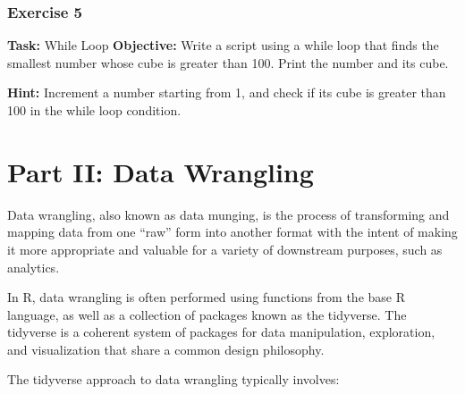 \documentclass[
]{book}
\begin{document}
\subsection*{Exercise 5}\label{exercise-5-1}

\textbf{Task:} While Loop
\textbf{Objective:} Write a script using a while loop that finds the smallest number whose cube is greater than 100. Print the number and its cube.

\textbf{Hint:} Increment a number starting from 1, and check if its cube is greater than 100 in the while loop condition.

\chapter*{Part II: Data Wrangling}\label{part-ii-data-wrangling}

Data wrangling, also known as data munging, is the process of
transforming and mapping data from one ``raw'' form into another format
with the intent of making it more appropriate and valuable for a variety
of downstream purposes, such as analytics.

In R, data wrangling is often performed using functions from the base R
language, as well as a collection of packages known as the tidyverse.
The tidyverse is a coherent system of packages for data manipulation,
exploration, and visualization that share a common design philosophy.

The tidyverse approach to data wrangling typically involves:
\end{document}
